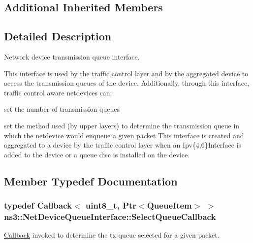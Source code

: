 \subsection*{Additional Inherited Members}


\subsection{Detailed Description}
Network device transmission queue interface. 

This interface is used by the traffic control layer and by the aggregated device to access the transmission queues of the device. Additionally, through this interface, traffic control aware netdevices can\+:
\begin{DoxyItemize}
\item set the number of transmission queues
\item set the method used (by upper layers) to determine the transmission queue in which the netdevice would enqueue a given packet This interface is created and aggregated to a device by the traffic control layer when an Ipv\{4,6\}Interface is added to the device or a queue disc is installed on the device. 
\end{DoxyItemize}

\subsection{Member Typedef Documentation}
\subsubsection[{\texorpdfstring{Select\+Queue\+Callback}{SelectQueueCallback}}]{\setlength{\rightskip}{0pt plus 5cm}typedef {\bf Callback}$<$ uint8\+\_\+t, {\bf Ptr}$<${\bf Queue\+Item}$>$ $>$ {\bf ns3\+::\+Net\+Device\+Queue\+Interface\+::\+Select\+Queue\+Callback}}\hypertarget{classns3_1_1NetDeviceQueueInterface_aaac934ccd4f0cf5517b2b0a0f4ab7a5a}{}\label{classns3_1_1NetDeviceQueueInterface_aaac934ccd4f0cf5517b2b0a0f4ab7a5a}


\hyperlink{classns3_1_1Callback}{Callback} invoked to determine the tx queue selected for a given packet. 



